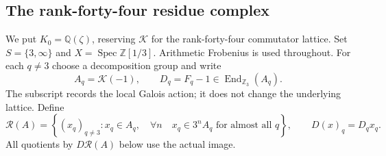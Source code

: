 \subsection{The rank-forty-four residue complex}

We put $K_0=\mathbb Q(\zeta)$, reserving $\mathcal K$ for the
rank-forty-four commutator lattice. Set $S=\{3,\infty\}$ and
$X=\operatorname{Spec}\mathbb Z[1/3]$. Arithmetic Frobenius is used
throughout. For each $q\ne3$ choose a decomposition group and write
\[
 A_q=\mathcal K(-1),\qquad D_q=F_q-1\in\operatorname{End}_{\mathbb Z_3}(A_q).
\]
The subscript records the local Galois action; it does not change the
underlying lattice. Define
\[
 \mathcal R(A)=\left\{(x_q)_{q\ne3}: x_q\in A_q,
 \quad\forall n\quad x_q\in3^nA_q\text{ for almost all }q\right\},
 \qquad D(x)_q=D_qx_q.
\]
All quotients by $D\mathcal R(A)$ below use the actual image.

